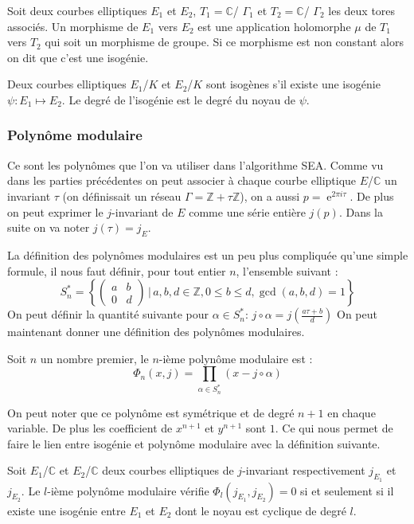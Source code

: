 \documentclass[12pt]{article}
\DeclareMathOperator{\e}{e}
\begin{document}
\begin{defi}
Soit deux courbes elliptiques $E_1$ et $E_2$, $T_1=\mathbb{C}$/ $\Gamma_1$ et $T_2 = \mathbb{C}$/ $\Gamma_2$ les deux tores associés. Un morphisme de $E_1$ vers $E_2$ est une application holomorphe $\mu$ de $T_1$ vers $T_2$ qui soit un morphisme de groupe. Si ce morphisme est non constant alors on dit que c'est une isogénie.
\end{defi}

Deux courbes elliptiques $E_1$/$K$ et $E_2$/$K$ sont isogènes s'il existe une isogénie $\psi : E_1 \mapsto E_2$. Le degré de l’isogénie est le degré du noyau de $\psi$.


\subsubsection{Polynôme modulaire}
Ce sont les polynômes que l'on va utiliser dans l'algorithme SEA. Comme vu dans les parties précédentes on peut associer à chaque courbe elliptique $E$/$\mathbb{C}$ un invariant $\tau$ (on définissait un réseau $\Gamma = \mathbb{Z}+\tau \mathbb{Z}$), on a aussi $p=\e^{2\pi i \tau}$. De plus on peut exprimer le $j$-invariant de $E$ comme une série entière $j(p)$. Dans la suite on va noter $j(\tau) = j_E$.

La définition des polynômes modulaires est un peu plus compliquée qu'une simple formule, il nous faut définir, pour tout entier $n$, l'ensemble suivant : 
\begin{equation*}
S_n^* = \left\{ \begin{pmatrix}
a & b\\
0 & d
\end{pmatrix}
\, | \, a,b,d \in \mathbb{Z}, 0 \leq b \leq d, \gcd(a,b,d) = 1
 \right\} 
\end{equation*}
On peut définir la quantité suivante pour $\alpha \in S_n^* $:  $j \circ \alpha = j(\frac{a\tau +b}{d})$
On peut maintenant donner une définition des polynômes modulaires.

\begin{defi}
Soit $n$ un nombre premier, le $n$-ième polynôme modulaire est :
\begin{equation*}
\Phi_n(x,j) = \prod_{\alpha \in S_n^*} (x - j \circ \alpha)
\end{equation*}
\end{defi}
On peut noter que ce polynôme est symétrique et de degré $n+1$ en chaque variable. De plus les coefficient de $x^{n+1}$ et $y^{n+1}$ sont $1$.
Ce qui nous permet de faire le lien entre isogénie et polynôme modulaire avec la définition suivante.
\begin{defi}
Soit $E_1$/$\mathbb{C}$ et $E_2$/$\mathbb{C}$ deux courbes elliptiques de $j$-invariant respectivement $j_{E_1}$ et $j_{E_2}$. Le $l$-ième polynôme modulaire vérifie $\Phi_l(j_{E_1},j_{E_2}) = 0$ si et seulement si il existe une isogénie entre $E_1$ et $E_2$ dont le noyau est cyclique de degré $l$.
\end{defi}
\end{document}
